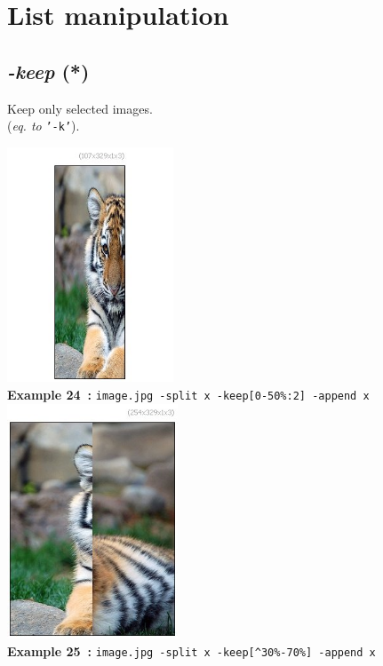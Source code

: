 \documentclass[a4paper,11pt,twoside]{book}
\begin{document}
\section{List manipulation}


\subsection{\emph{-keep} (*)}\vspace*{-0.5em}
Keep only selected images.
~\\(\emph{eq. to} {\small \texttt{'-k'}}).
\begin{center}\includegraphics[keepaspectratio=true,height=7cm,width=\textwidth]{img/gmic_def24.jpg}\\
{\footnotesize \textbf{Example 24~:} \texttt{image.jpg -split x -keep[0-50\%:2] -append x}}
\\\includegraphics[keepaspectratio=true,height=7cm,width=\textwidth]{img/gmic_def25.jpg}\\
{\footnotesize \textbf{Example 25~:} \texttt{image.jpg -split x -keep[\textasciicircum 30\%-70\%] -append x}}
\end{center}
\end{document}
